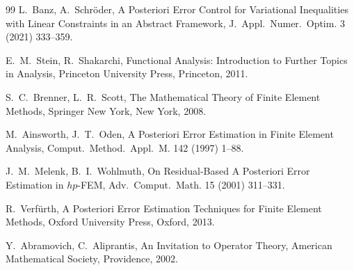 \documentclass[12pt,twoside,reqno]{amsart}
\theoremstyle{definition}
\numberwithin{equation}{section}
\begin{document}
\begin{thebibliography}{99}
 L.~Banz, A.~Schröder, A Posteriori Error Control for Variational Inequalities with Linear Constraints in an Abstract Framework, J.~Appl.~Numer.~Optim. 3 (2021) 333--359.

 E.~M.~Stein, R.~Shakarchi, Functional Analysis: Introduction to Further Topics in Analysis, Princeton University Press, Princeton, 2011.

 S.~C.~Brenner, L.~R.~Scott, The Mathematical Theory of Finite Element Methods, Springer New York, New York, 2008.

 M.~Ainsworth, J.~T.~Oden, A Posteriori Error Estimation in Finite Element Analysis, Comput.~Method.~Appl.~M. 142 (1997) 1--88.

 J.~M.~Melenk, B.~I.~Wohlmuth, On Residual-Based A Posteriori Error Estimation in $hp$-FEM, Adv.~Comput.~Math. 15 (2001) 311--331.

 R.~Verfürth, A Posteriori Error Estimation Techniques for Finite Element Methods, Oxford University Press, Oxford, 2013.


 Y.~Abramovich, C.~Aliprantis, An Invitation to Operator Theory, American Mathematical Society, Providence, 2002.

\end{thebibliography}
\end{document}
